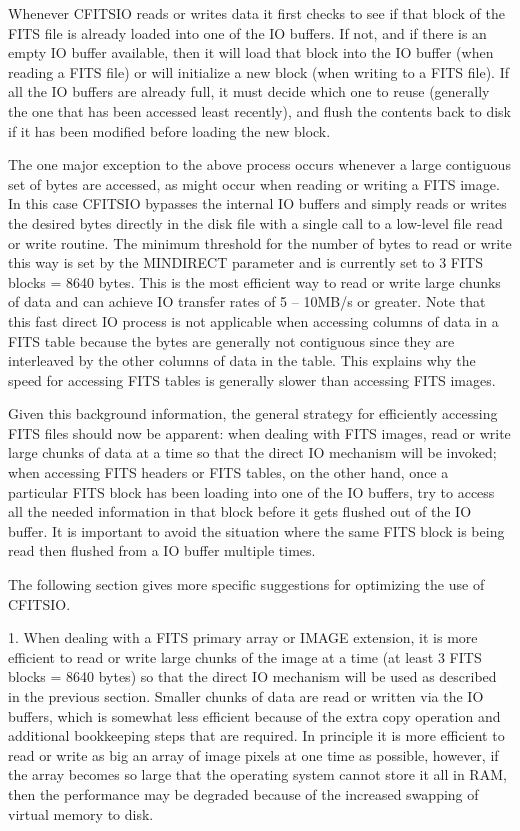 \documentclass[11pt]{book}
\begin{document}
Whenever CFITSIO reads or writes data it first checks to see if that
block of the FITS file is already loaded into one of the IO buffers.
If not, and if there is an empty IO buffer available, then it will load
that block into the IO buffer (when reading a FITS file) or will
initialize a new block (when writing to a FITS file).  If all the IO
buffers are already full, it must decide which one to reuse (generally
the one that has been accessed least recently), and flush the contents
back to disk if it has been modified before loading the new block.

The one major exception to the above process occurs whenever a large
contiguous set of bytes are accessed, as might occur when reading or
writing a FITS image.  In this case CFITSIO bypasses the internal IO
buffers and simply reads or writes the desired bytes directly in the
disk file with a single call to a low-level file read or write
routine.  The minimum threshold for the number of bytes to read or
write this way is set by the MINDIRECT parameter and is currently set
to 3 FITS blocks = 8640 bytes.  This is the most efficient way to read
or write large chunks of data and can achieve IO transfer rates of
5 -- 10MB/s or greater.  Note that this fast direct IO process is not
applicable when accessing columns of data in a FITS table because the
bytes are generally not contiguous since they are interleaved by the
other columns of data in the table.  This explains why the speed for
accessing FITS tables is generally slower than accessing
FITS images.

Given this background information, the general strategy for efficiently
accessing FITS files should now be apparent:  when dealing with FITS
images, read or write large chunks of data at a time so that the direct
IO mechanism will be invoked;  when accessing FITS headers or FITS
tables, on the other hand, once a particular FITS block has been
loading into one of the IO buffers, try to access all the needed
information in that block before it gets flushed out of the IO buffer.
It is important to avoid the situation where the same FITS block is
being read then flushed from a IO buffer multiple times.

The following section gives more specific suggestions for optimizing
the use of CFITSIO.

1.  When dealing with a FITS primary array or IMAGE extension, it is
more efficient to read or write large chunks of the  image at a time
(at least 3 FITS blocks = 8640 bytes) so that the direct IO mechanism
will be used as described in the previous section.  Smaller chunks of
data are read or written via the IO buffers, which is somewhat less
efficient because of the extra copy operation and additional
bookkeeping steps that are required.  In principle it is more efficient
to read or write as big an array of image pixels at one time as
possible, however, if the array becomes so large that the operating
system cannot store it all in RAM, then the performance may be degraded
because of the increased swapping of virtual memory to disk.
\end{document}
